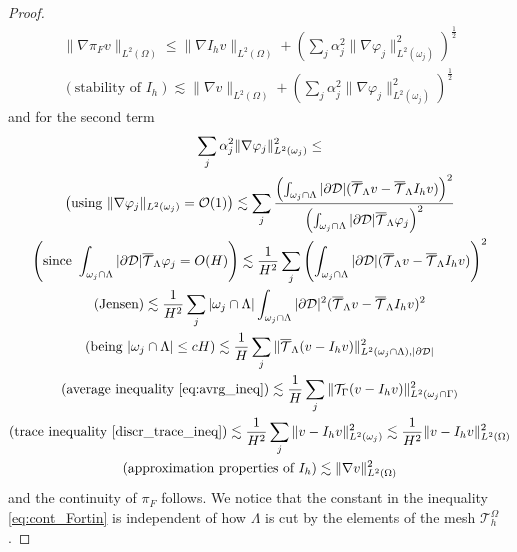 \begin{proof}
\begin{multline*}
\|\nabla \pi_F v \|_{L^2(\Omega)} \leq \|\nabla I_h v\|_{L^2(\Omega)} + \left(\sum_j\alpha_j^2\|\nabla \varphi _j\|^2_{L^2(\omega_j)}\right)^{\frac 12}\\
(\text{stability of }I_h)\lesssim   \|\nabla  v\|_{L^2(\Omega)} + \left(\sum_j\alpha_j^2\|\nabla \varphi _j\|^2_{L^2(\omega_j)}\right)^{\frac 12}
\end{multline*}
and for the second term 
\begin{multline*}
\sum_j \alpha_j ^2\|\nabla \varphi _j\|^2_{L^2(\omega_j)}\leq
\\
\left(\text{using }\|\nabla \varphi _j\|_{{L^2(\omega_j)}}=\mathcal{O}(1)\right) \lesssim  \sum_j \frac{\left(\int_{\omega _j\cap \Lambda} |\partial\mathcal{D}| ({\overline{\mathcal{T}}_\Lambda} v-{\overline{\mathcal{T}}_\Lambda} I_h v)\right)^2}{\left(\int_{\omega _j\cap \Lambda}|\partial\mathcal{D}|{\overline{\mathcal{T}}_\Lambda} \varphi_j \right)^2}
\\
\left(\text{since }\int_{\omega _j\cap \Lambda}|\partial\mathcal{D}|{\overline{\mathcal{T}}_\Lambda} \varphi_j=O(H)\right) \lesssim \frac {1}{H^2} \sum_j \left(\int_{\omega _j\cap \Lambda} |\partial\mathcal{D}| ({\overline{\mathcal{T}}_\Lambda} v-{\overline{\mathcal{T}}_\Lambda} I_hv)\right)^2
\\
(\text{Jensen}) \lesssim  \frac {1}{H^2} \sum_j |\omega _j\cap \Lambda| \int_{\omega _j\cap \Lambda} |\partial\mathcal{D}|^2({\overline{\mathcal{T}}_\Lambda} v-{\overline{\mathcal{T}}_\Lambda} I_h v)^2
\\
(\text{being }|\omega _j\cap \Lambda| \leq cH)\lesssim  \frac {1}{H} \sum_j \| {\overline{\mathcal{T}}_\Lambda} (v-I_h v)\|^2_{L^2(\omega _j\cap \Lambda), |\partial\mathcal{D}|}
\\
(\text{average inequality \eqref{eq:avrg_ineq}} ) \lesssim  \frac {1}{H} \sum_j \| {\mathcal{T}_\Gamma}(v-I_h v)\|^2_{L^2(\omega _j\cap \Gamma)}  
\\
\left(\text{trace inequality \eqref{discr_trace_ineq}} \right)\lesssim  \frac {1}{H^2} \sum_j  \| v-I_h v\|^2_{L^2(\omega_j)} \lesssim  \frac {1}{H^2}  \| v-I_h v\|^2_{L^2(\Omega)} 
\\
(\text{approximation properties of }I_h)\lesssim \|\nabla  v\|^2_{L^2(\Omega)}
\end{multline*}
and the continuity of $\pi_F$ follows. We notice that the constant in the inequality \eqref{eq:cont_Fortin} is independent of how $\Lambda$  is cut by the elements of the mesh $\mathcal{T}_h^{\Omega}$.
\end{proof}


